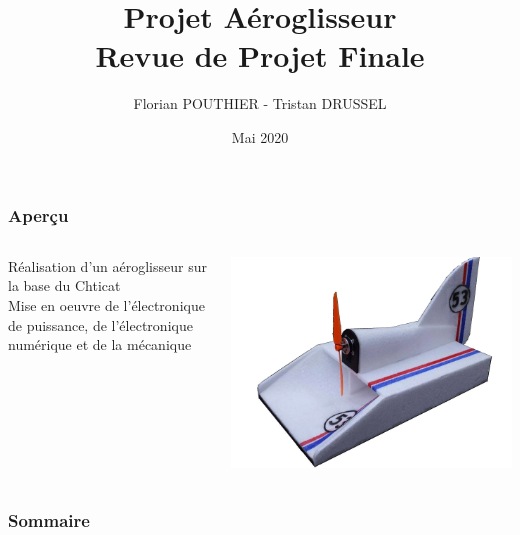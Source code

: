 \documentclass{beamer}
\title[Revue de projet Final]{Projet Aéroglisseur \\Revue de Projet Finale}
\author[]{Florian POUTHIER - Tristan DRUSSEL}
\date{Mai 2020}
\institute{4ème année Génie Électrique - INSA Strasbourg}
\begin{document}
	\begin{frame}
		\titlepage
	\end{frame}
	\begin{frame}
		\frametitle{Aperçu}
		\begin{columns}[T]
	  		\begin{column}{0.5\textwidth}
	    	Réalisation d'un aéroglisseur sur la base du Chticat\\
	    	Mise en oeuvre de l'électronique de puissance, de l'électronique numérique et de la mécanique
	  		\end{column}
	  		\begin{column}{0.5\textwidth}
	    	\includegraphics[width=\textwidth]{"../Illus/Chticat.png"}
	  		\end{column}
		\end{columns}
	\end{frame}
	\begin{frame}
		\frametitle{Sommaire}
		\tableofcontents
	\end{frame}
\end{document}

